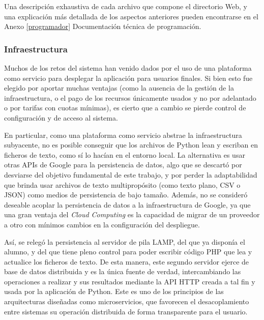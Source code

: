 Una descripción exhaustiva de cada archivo que compone el directorio Web, y una explicación más detallada de los aspectos anteriores pueden encontrarse en el Anexo \ref{programador} \guillemotleft Documentación técnica de programación\guillemotright. 

\subsubsection{Infraestructura}

Muchos de los retos del sistema han venido dados por el uso de una plataforma como servicio para desplegar la aplicación para usuarios finales. Si bien esto fue elegido por aportar muchas ventajas (como la ausencia de la gestión de la infraestructura, o el pago de los recursos únicamente usados y no por adelantado o por tarifas con cuotas mínimas), es cierto que a cambio se pierde control de configuración y de acceso al sistema.

En particular, como una plataforma como servicio abstrae la infraestructura subyacente, no es posible conseguir que los archivos de Python lean y escriban en ficheros de texto, como sí lo hacían en el entorno local. La alternativa es usar otras APIs de Google para la persistencia de datos, algo que se descartó por desviarse del objetivo fundamental de este trabajo, y por perder la adaptabilidad que brinda usar archivos de texto multipropósito (como texto plano, CSV o JSON) como medios de persistencia de bajo tamaño. Además, no se consideró deseable acoplar la persistencia de datos a la infraestructura de Google, ya que una gran ventaja del \textit{Cloud Computing} es la capacidad de migrar de un proveedor a otro con mínimos cambios en la configuración del despliegue.

Así, se relegó la persistencia al servidor de pila LAMP, del que ya disponía el alumno, y del que tiene pleno control para poder escribir código PHP que lea y actualice los ficheros de texto. De esta manera, este segundo servidor ejerce de base de datos distribuida y es la única fuente de verdad, intercambiando las operaciones a realizar y sus resultados mediante la API HTTP creada a tal fin y usada por la aplicación de Python. Este es uno de los principios de las arquitecturas diseñadas como microservicios, que favorecen el desacoplamiento entre sistemas su operación distribuida de forma transparente para el usuario.

